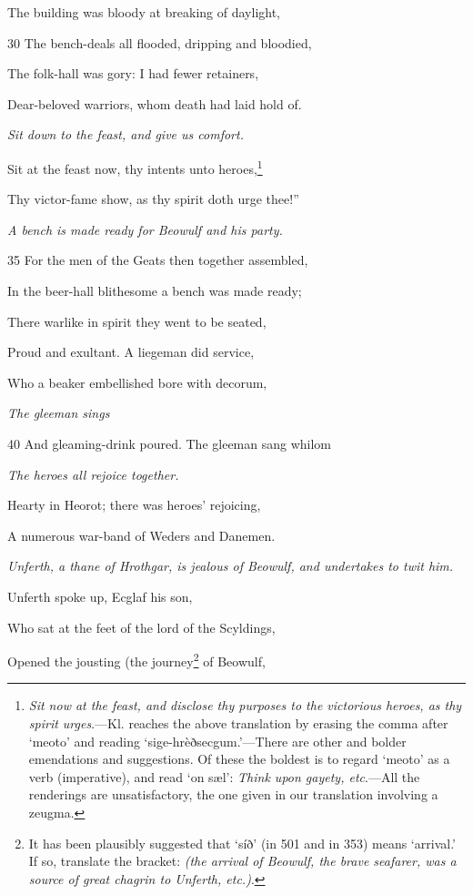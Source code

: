 The building was bloody at breaking of daylight,

30
The bench-deals all flooded, dripping and bloodied,

The folk-hall was gory: I had fewer retainers,

Dear-beloved warriors, whom death had laid hold of.

\emph{Sit down to the
feast, and give us
comfort.}

Sit at the feast now, thy intents unto heroes,\footnote{\emph{Sit now at the feast, and disclose thy purposes to the victorious heroes, as
thy spirit urges}.—Kl. reaches the above translation by erasing the comma
after ‘meoto’ and reading ‘sige-hrèðsecgum.’—There are other and bolder
emendations and suggestions. Of these the boldest is to regard ‘meoto’ as a
verb (imperative), and read ‘on sæl’: \emph{Think upon gayety, etc}.—All the renderings
are unsatisfactory, the one given in our translation involving a zeugma.}

Thy victor-fame show, as thy spirit doth urge thee!”

\emph{A bench is made
ready for Beowulf
and his party.}

35
For the men of the Geats then together assembled,

In the beer-hall blithesome a bench was made ready;

There warlike in spirit they went to be seated,

Proud and exultant. A liegeman did service,

Who a beaker embellished bore with decorum,

\emph{The gleeman sings}

40
And gleaming-drink poured. The gleeman sang whilom

\emph{The heroes all rejoice
together.}

Hearty in Heorot; there was heroes’ rejoicing,

A numerous war-band of Weders and Danemen.



\emph{Unferth, a thane
of Hrothgar, is
jealous of Beowulf,
and undertakes to
twit him.}

Unferth spoke up, Ecglaf his son,

Who sat at the feet of the lord of the Scyldings,

Opened the jousting (the journey\footnote{It has been plausibly suggested that ‘síð’ (in 501 and in 353) means
‘arrival.’ If so, translate the bracket: \emph{(the arrival of Beowulf, the brave
seafarer, was a source of great chagrin to Unferth, etc.)}.} of Beowulf,

